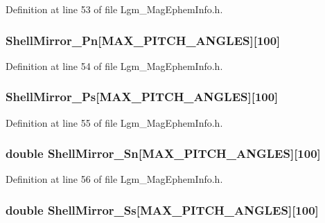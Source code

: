 Definition at line 53 of file Lgm\_\-MagEphemInfo.h.\hypertarget{struct_lgm___mag_ephem_info_77f62c23ad73c46d65a58f3bd4df0007}{
\subsubsection[{ShellMirror\_\-Pn}]{ {\bf ShellMirror\_\-Pn}\mbox{[}MAX\_\-PITCH\_\-ANGLES\mbox{]}\mbox{[}100\mbox{]}}}
\label{struct_lgm___mag_ephem_info_77f62c23ad73c46d65a58f3bd4df0007}




Definition at line 54 of file Lgm\_\-MagEphemInfo.h.\hypertarget{struct_lgm___mag_ephem_info_f553d1e4efe198e474d5a38de0c6da91}{
\subsubsection[{ShellMirror\_\-Ps}]{ {\bf ShellMirror\_\-Ps}\mbox{[}MAX\_\-PITCH\_\-ANGLES\mbox{]}\mbox{[}100\mbox{]}}}
\label{struct_lgm___mag_ephem_info_f553d1e4efe198e474d5a38de0c6da91}




Definition at line 55 of file Lgm\_\-MagEphemInfo.h.\hypertarget{struct_lgm___mag_ephem_info_73c4025c84afef4f83812e9a70b69a72}{
\subsubsection[{ShellMirror\_\-Sn}]{\setlength{\rightskip}{0pt plus 5cm}double {\bf ShellMirror\_\-Sn}\mbox{[}MAX\_\-PITCH\_\-ANGLES\mbox{]}\mbox{[}100\mbox{]}}}
\label{struct_lgm___mag_ephem_info_73c4025c84afef4f83812e9a70b69a72}




Definition at line 56 of file Lgm\_\-MagEphemInfo.h.\hypertarget{struct_lgm___mag_ephem_info_79d06251c694db0e26c64222f2078419}{
\subsubsection[{ShellMirror\_\-Ss}]{\setlength{\rightskip}{0pt plus 5cm}double {\bf ShellMirror\_\-Ss}\mbox{[}MAX\_\-PITCH\_\-ANGLES\mbox{]}\mbox{[}100\mbox{]}}}
\label{struct_lgm___mag_ephem_info_79d06251c694db0e26c64222f2078419}





